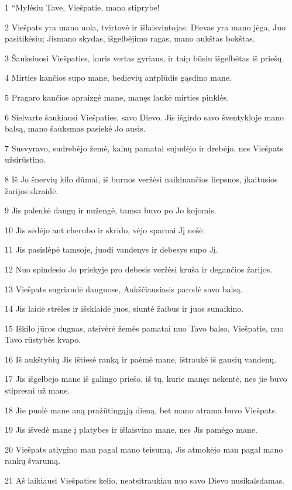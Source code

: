 \par 1 “Mylėsiu Tave, Viešpatie, mano stiprybe! 
\par 2 Viešpats yra mano uola, tvirtovė ir išlaisvintojas. Dievas yra mano jėga, Juo pasitikėsiu; Jis­mano skydas, išgelbėjimo ragas, mano aukštas bokštas. 
\par 3 Šauksiuosi Viešpaties, kuris vertas gyriaus, ir taip būsiu išgelbėtas iš priešų. 
\par 4 Mirties kančios supo mane, bedievių antplūdis gąsdino mane. 
\par 5 Pragaro kančios apraizgė mane, manęs laukė mirties pinklės. 
\par 6 Sielvarte šaukiausi Viešpaties, savo Dievo. Jis išgirdo savo šventykloje mano balsą, mano šauksmas pasiekė Jo ausis. 
\par 7 Susvyravo, sudrebėjo žemė, kalnų pamatai sujudėjo ir drebėjo, nes Viešpats užsirūstino. 
\par 8 Iš Jo šnervių kilo dūmai, iš burnos veržėsi naikinančios liepsnos, įkaitusios žarijos skraidė. 
\par 9 Jis palenkė dangų ir nužengė, tamsa buvo po Jo kojomis. 
\par 10 Jis sėdėjo ant cherubo ir skrido, vėjo sparnai Jį nešė. 
\par 11 Jis pasislėpė tamsoje, juodi vandenys ir debesys supo Jį. 
\par 12 Nuo spindesio Jo priekyje pro debesis veržėsi kruša ir degančios žarijos. 
\par 13 Viešpats sugriaudė danguose, Aukščiausiasis parodė savo balsą. 
\par 14 Jis laidė strėles ir išsklaidė juos, siuntė žaibus ir juos sunaikino. 
\par 15 Iškilo jūros dugnas, atsivėrė žemės pamatai nuo Tavo balso, Viešpatie, nuo Tavo rūstybės kvapo. 
\par 16 Iš aukštybių Jis ištiesė ranką ir paėmė mane, ištraukė iš gausių vandenų. 
\par 17 Jis išgelbėjo mane iš galingo priešo, iš tų, kurie manęs nekentė, nes jie buvo stipresni už mane. 
\par 18 Jie puolė mane aną pražūtingąją dieną, bet mano atrama buvo Viešpats. 
\par 19 Jis išvedė mane į platybes ir išlaisvino mane, nes Jis pamėgo mane. 
\par 20 Viešpats atlygino man pagal mano teisumą, Jis atmokėjo man pagal mano rankų švarumą. 
\par 21 Aš laikiausi Viešpaties kelio, neatsitraukiau nuo savo Dievo nusikalsdamas. 
